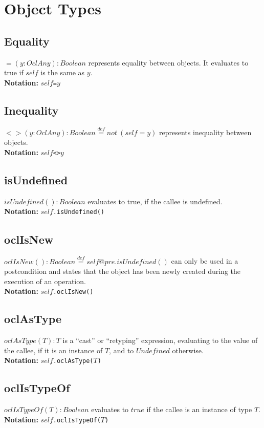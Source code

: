 \section{Object Types}
\subsection{Equality}
$=(y:\mathit{OclAny}):\mathit{Boolean}$ represents equality
between objects. It evaluates to true if $\mathit{self}$ is the same as $y$.\\
{\bf Notation:} $\mathit{self}$\verb+=+$y$
\subsection{Inequality}
$<>(y:\mathit{OclAny}):\mathit{Boolean}\stackrel{\mathit{def}}{=}\mathit{not}\ (
\mathit{self}=y)$ represents inequality between objects.\\
{\bf Notation:} $\mathit{self}$\verb+<>+$y$
\subsection{isUndefined}
$\mathit{isUndefined}():\mathit{Boolean}$ evaluates to true, if the
callee is undefined.\\
{\bf Notation:} $\mathit{self}$\verb+.isUndefined()+
\subsection{oclIsNew}
$\mathit{oclIsNew}():\mathit{Boolean}\stackrel{\mathit{def}}{=}
\mathit{self}@\mathit{pre}.\mathit{isUndefined}()$ can only be used
in a postcondition and states that the object has
been newly created during the execution of an operation.\\
{\bf Notation:} $\mathit{self}$\verb+.oclIsNew()+
\subsection{oclAsType}
$\mathit{oclAsType}(T):T$ is a ``cast'' or ``retyping'' expression,
  evaluating to the value of the callee, if it is an instance of $T$,
  and to $\mathit{Undefined}$ otherwise.\\
  {\bf Notation:} $\mathit{self}$\verb+.oclAsType(+$T$\verb+)+
\subsection{oclIsTypeOf}
$\mathit{oclIsTypeOf}(T):\mathit{Boolean}$ evaluates to $\mathit{true}$ if the
callee is an instance of type $T$.\\
{\bf Notation:} $\mathit{self}$\verb+.oclIsTypeOf(+$T$\verb+)+
